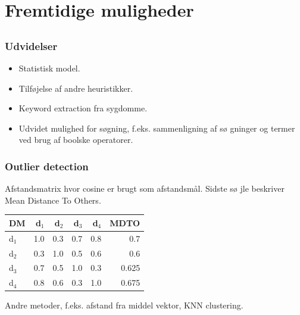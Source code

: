\documentclass[xcolor=table]{beamer}
\begin{document}
\section{Fremtidige muligheder}

\subsection*{}

\begin{frame}

  \frametitle{Udvidelser}

  \begin{itemize}
    \item Statistisk model.
    \item Tilf\o jelse af andre heuristikker.
    \item Keyword extraction fra sygdomme.
    \item Udvidet mulighed for s\o gning, f.eks. sammenligning af s\o
      gninger og termer ved brug af boolske operatorer.
  \end{itemize}

\end{frame}

\begin{frame}

  \frametitle{Outlier detection}

  Afstandsmatrix hvor cosine er brugt som afstandsm\aa l. Sidste s\o
  jle beskriver Mean Distance To Others.

  \begin{center}
    \begin{tabular}{|l|r|r|r|r|r|}
      \hline
      DM    & d$_1$ & d$_2$ & d$_3$ & d$_4$ & MDTO \\
      \hline
      d$_1$ &   1.0 &   0.3 &   0.7 &   0.8 & 0.7 \\
      \hline
      d$_2$ &   0.3 &   1.0 &   0.5 &   0.6 & 0.6 \\
      \hline
      d$_3$ &   0.7 &   0.5 &   1.0 &   0.3 & 0.625 \\
      \hline
      d$_4$ &   0.8 &   0.6 &   0.3 &   1.0 & 0.675 \\
      \hline
    \end{tabular}
  \end{center}


  Andre metoder, f.eks. afstand fra middel vektor, KNN
  clustering.

\end{frame}
\end{document}
